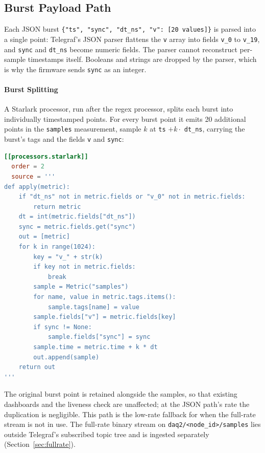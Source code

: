 \subsection{Burst Payload Path}
Each JSON burst \texttt{\{"ts", "sync", "dt\_ns", "v": [20 values]\}} is parsed into a single point: Telegraf's JSON parser flattens the \texttt{v} array into fields \texttt{v\_0} to \texttt{v\_19}, and \texttt{sync} and \texttt{dt\_ns} become numeric fields. The parser cannot reconstruct per-sample timestamps itself. Booleans and strings are dropped by the parser, which is why the firmware sends \texttt{sync} as an integer.

\paragraph{Burst Splitting} A Starlark processor, run after the regex processor, splits each burst into individually timestamped points. For every burst point it emits 20 additional points in the \texttt{samples} measurement, sample $k$ at \texttt{ts} $+ k \cdot$ \texttt{dt\_ns}, carrying the burst's tags and the fields \texttt{v} and \texttt{sync}:

\begin{lstlisting}[language=toml]
[[processors.starlark]]
  order = 2
  source = '''
def apply(metric):
    if "dt_ns" not in metric.fields or "v_0" not in metric.fields:
        return metric
    dt = int(metric.fields["dt_ns"])
    sync = metric.fields.get("sync")
    out = [metric]
    for k in range(1024):
        key = "v_" + str(k)
        if key not in metric.fields:
            break
        sample = Metric("samples")
        for name, value in metric.tags.items():
            sample.tags[name] = value
        sample.fields["v"] = metric.fields[key]
        if sync != None:
            sample.fields["sync"] = sync
        sample.time = metric.time + k * dt
        out.append(sample)
    return out
'''
\end{lstlisting}

The original burst point is retained alongside the samples, so that existing dashboards and the liveness check are unaffected; at the JSON path's rate the duplication is negligible. This path is the low-rate fallback for when the full-rate stream is not in use. The full-rate binary stream on \texttt{daq2/<node\_id>/samples} lies outside Telegraf's subscribed topic tree and is ingested separately (Section~\ref{sec:fullrate}).

